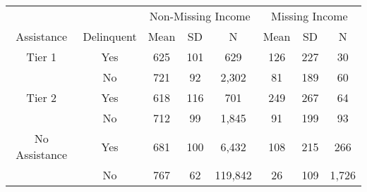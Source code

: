 \begin{tabular}{cccccccc}
\toprule 
\midrule 
\multicolumn{2}{c}{} & \multicolumn{3}{c}{Non-Missing Income} & \multicolumn{3}{c}{Missing Income} \\
 \cmidrule(lr){3-5} \cmidrule(lr){6-8} 
Assistance & Delinquent & Mean & SD & N & Mean & SD & N \\
\midrule 
Tier 1 & Yes & 625 & 101 & 629 & 126 & 227 & 30 \\
 & No & 721 & 92 & 2,302 & 81 & 189 & 60 \\
\midrule 
Tier 2 & Yes & 618 & 116 & 701 & 249 & 267 & 64 \\
 & No & 712 & 99 & 1,845 & 91 & 199 & 93 \\
\midrule 
No Assistance & Yes & 681 & 100 & 6,432 & 108 & 215 & 266 \\
 & No & 767 & 62 & 119,842 & 26 & 109 & 1,726 \\
\midrule 
\bottomrule 
\end{tabular}

